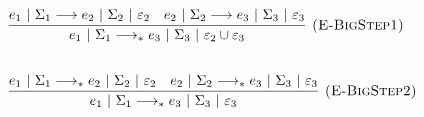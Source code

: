 \documentclass{llncs}
\begin{document}
			

\[
\begin{array}{lll}
			
			\infer[\textsc{(E-BigStep1)}]
			{e_1~|~\Sigma_1 \longrightarrow_* e_3~|~\Sigma_3~|~\varepsilon_2 \cup \varepsilon_3}
			{e_1~|~\Sigma_1 \longrightarrow e_2~|~\Sigma_2~|~\varepsilon_2
		  & e_2~|~\Sigma_2 \longrightarrow e_3~|~\Sigma_3~|~\varepsilon_3} \\[5ex]
			
			\infer[\textsc{(E-BigStep2)}]
			{e_1~|~\Sigma_1 \longrightarrow_* e_3~|~\Sigma_3~|~\varepsilon_3}
			{e_1~|~\Sigma_1 \longrightarrow_* e_2~|~\Sigma_2~|~\varepsilon_2 & e_2~|~\Sigma_2 \longrightarrow_* e_3~|~\Sigma_3~|~\varepsilon_3 }
			
		
\end{array}
\]
\end{document}

